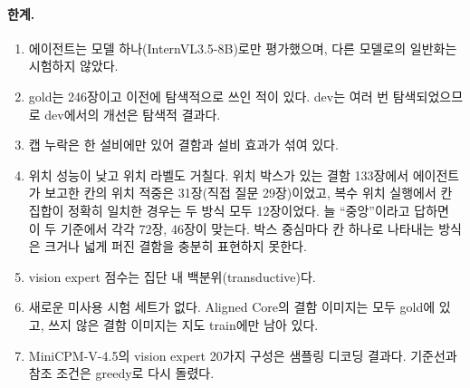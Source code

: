 \documentclass[11pt]{article}
\begin{document}
\paragraph{한계.}
\begin{enumerate}
  \item 에이전트는 모델 하나(InternVL3.5-8B)로만 평가했으며, 다른 모델로의 일반화는 시험하지 않았다.
  \item gold는 246장이고 이전에 탐색적으로 쓰인 적이 있다. dev는 여러 번 탐색되었으므로 dev에서의 개선은 탐색적 결과다.
  \item 캡 누락은 한 설비에만 있어 결함과 설비 효과가 섞여 있다.
  \item 위치 성능이 낮고 위치 라벨도 거칠다. 위치 박스가 있는 결함 133장에서 에이전트가 보고한 칸의 위치 적중은 31장(직접 질문 29장)이었고, 복수 위치 실행에서 칸 집합이 정확히 일치한 경우는 두 방식 모두 12장이었다. 늘 ``중앙''이라고 답하면 이 두 기준에서 각각 72장, 46장이 맞는다. 박스 중심마다 칸 하나로 나타내는 방식은 크거나 넓게 퍼진 결함을 충분히 표현하지 못한다.
  \item vision expert 점수는 집단 내 백분위(transductive)다.
  \item 새로운 미사용 시험 세트가 없다. Aligned Core의 결함 이미지는 모두 gold에 있고, 쓰지 않은 결함 이미지는 지도 train에만 남아 있다.
  \item MiniCPM-V-4.5의 vision expert 20가지 구성은 샘플링 디코딩 결과다. 기준선과 참조 조건은 greedy로 다시 돌렸다.
\end{enumerate}
\end{document}
